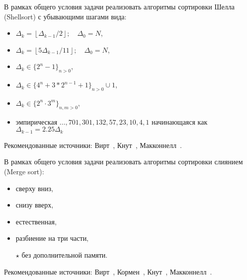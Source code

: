 
\begin{zztask}[Шелла]
В рамках общего условия задачи реализовать алгоритмы сортировки Шелла (Shellsort) с убывающими шагами вида:
\begin{itemize}[--]
\item $\Delta_k = \left\lfloor\Delta_{k-1}/2\right\rfloor;\quad\Delta_0=N$,
\item $\Delta_k = \left\lfloor5\Delta_{k-1}/11\right\rfloor;\quad\Delta_0=N$,
\item $\Delta_k \in \{2^n-1\}_{n>0}$,
\item $\Delta_k \in \{4^n+3*2^{n-1}+1\}_{n>0}\cup{1}$,
\item $\Delta_k \in \{2^n \cdot 3^m\}_{n,m>0}$,
\item эмпирическая $\dots,701,301,132,57,23,10,4,1$ начинающаяся как $\Delta_{k-1} = 2.25\Delta_{k}$
\end{itemize}
%
Рекомендованные источники:
Вирт~\cite[\S2.3.1]{wirth2016algoritmy},
Кнут~\cite[\S5.2.1]{knuth2014iskusstvo},
Макконнелл~\cite[\S3.3]{mcconnel2009analyz}.
\end{zztask}


\begin{zztask}[Слиянием]
В рамках общего условия задачи реализовать алгоритмы сортировки слиянием (Merge sort):
\begin{itemize}[--]
\item сверху вниз,
\item снизу вверх,
\item естественная,
\item разбиение на три части,
\item[$\star$] без дополнительной памяти.
\end{itemize}
%
Рекомендованные источники:
Вирт~\cite[\S2.4.1--2.4.3]{wirth2016algoritmy},
Кормен~\cite[\S1.3]{kormen2016algoritmy},
Кнут~\cite[\S5.2.4]{knuth2014iskusstvo},
Макконнелл~\cite[\S3.6]{mcconnel2009analyz}.
\end{zztask}


